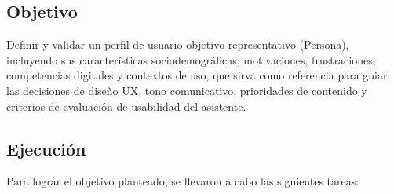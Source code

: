 \subsection{Objetivo}
Definir y validar un perfil de usuario objetivo representativo (Persona),
incluyendo sus características sociodemográficas, motivaciones, frustraciones,
competencias digitales y contextos de uso, que sirva como referencia para guiar
las decisiones de diseño UX, tono comunicativo, prioridades de contenido y
criterios de evaluación de usabilidad del asistente.

\subsection{Ejecución}
Para lograr el objetivo planteado, se llevaron a cabo las siguientes tareas:

